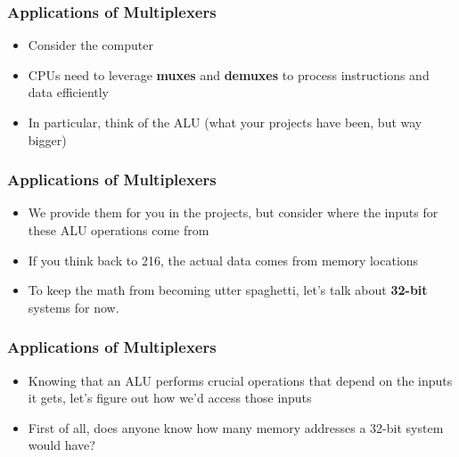 \documentclass{beamer}
\begin{document}
             \begin{frame}
             	\frametitle{Applications of Multiplexers}
             	\begin{itemize}
             		\item Consider the computer
             		\item CPUs need to leverage \textbf{muxes} and \textbf{demuxes} to process instructions and data efficiently
             		\item In particular, think of the ALU (what your projects have been, but way bigger)
             	\end{itemize}
             	
             \end{frame}
             
             
             \begin{frame}
             	\frametitle{Applications of Multiplexers}
             	\begin{itemize}
             		\item We provide them for you in the projects, but consider where the inputs for these ALU operations come from
             		\item If you think back to 216, the actual data comes from memory locations
             		\item To keep the math from becoming utter spaghetti, let's talk about \textbf{32-bit} systems for now.
             		
             	\end{itemize}
             	
             \end{frame}
             
             \begin{frame}
             
             	\frametitle{Applications of Multiplexers}
             	\begin{itemize}
             		\item Knowing that an ALU performs crucial operations that depend on the inputs it gets, let's figure out how we'd access those inputs
             		\item First of all, does anyone know how many memory addresses a 32-bit system would have?
             		
             	\end{itemize}
             	
             \end{frame}
             
\end{document}
